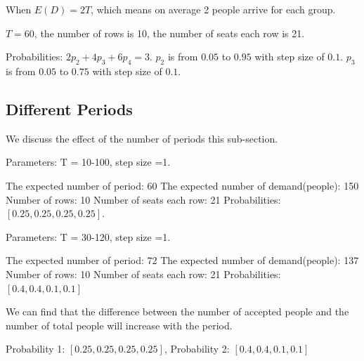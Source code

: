 When $E(D) = 2T$, which means on average 2 people arrive for each group.

$T = 60$, the number of rows is 10, the number of seats each row is 21.

Probabilities: 
$2p_2 + 4p_3 + 6p_4 =3$. $p_2$ is from $0.05$ to $0.95$ with step size of $0.1$. $p_3$ is from $0.05$ to $0.75$ with step size of $0.1$.


% 

\subsection{Different Periods}
We discuss the effect of the number of periods this sub-section. 

Parameters: T = 10-100, step size =1.

The expected number of period: 60
The expected number of demand(people): 150
Number of rows: 10
Number of seats each row: 21
Probabilities: $[0.25, 0.25, 0.25, 0.25]$.

Parameters: T = 30-120, step size =1.

The expected number of period: 72
The expected number of demand(people): 137
Number of rows: 10
Number of seats each row: 21
Probabilities: $[0.4, 0.4, 0.1, 0.1]$


% 
% 



We can find that the difference between the number of accepted people and the number of total people will increase with the period. 

Probability 1: $[0.25, 0.25, 0.25, 0.25]$,
Probability 2: $[0.4, 0.4, 0.1, 0.1]$

